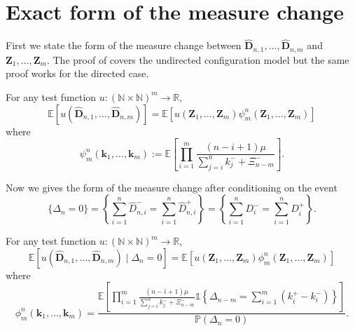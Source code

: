\documentclass[draft]{scrartcl}
\newcommand{\R}{\mathbb R}
\newcommand{\N}{\mathbb N}
\newcommand{\E}{\mathbb E}
\newcommand{\biasD}{\hat{D}}
\newcommand{\unconmc}{\psi}
\newcommand{\conmc}{\phi}
\newcommand{\defeq}{:=}
\newcommand{\indi}{\mathds{1}}
\newcommand{\vect}{\mathbf}
\renewcommand{\Pr}{\mathbb P}
\begin{document}
\section{Exact form of the measure change}

First we state the form of the measure change between $\vect{\biasD}_{n, 1}, \ldots, \vect{\biasD}_{n, m}$ and $\vect{Z}_1, \ldots, \vect{Z}_m$. The proof of \cite[Proposition 4.2]{conchon--kerjan_stable_2020} covers the undirected configuration model but the same proof works for the directed case.

\begin{theorem}
    \label{thm:unconditioned-mc}
    For any test function $u: (\N \times \N)^m \to \R$, 
    \begin{equation}
        \E[u(\vect{\biasD}_{n, 1}, \ldots, \vect{\biasD}_{n, m})] =
        \E[u(\vect{Z}_1, \ldots, \vect{Z}_m) \unconmc^n_m(\vect{Z}_1, \ldots, \vect{Z}_m)]
    \end{equation}
    where
    \begin{equation}
        \unconmc^n_m(\vect{k}_1, \ldots, \vect{k}_m) \defeq
        \E \left[ \prod_{i=1}^m \frac{(n - i + 1)\mu}{\sum_{j=i}^n k_j^- + \Xi^-_{n - m}}\right].
    \end{equation}
\end{theorem}

Now we gives the form of the measure change after conditioning on the event
\begin{equation}
    \{\Delta_n = 0\}
    = \left\{ \sum_{i=1}^n \biasD^-_{n, i} = \sum_{i=1}^n \biasD^+_{n, i} \right\}
    = \left\{ \sum_{i=1}^n D^-_i = \sum_{i=1}^n D^+_i \right\}.
\end{equation}

\begin{theorem}
    For any test function $u: (\N \times \N)^m \to \R$, 
    \begin{equation}
        \E\left[u(\vect{\biasD}_{n, 1}, \ldots, \vect{\biasD}_{n, m}) \mid \Delta_n = 0 \right] =
        \E[u(\vect{Z}_1, \ldots, \vect{Z}_m) \conmc^n_m(\vect{Z}_1, \ldots, \vect{Z}_m)]
        \label{eq:conditioned-measure-change-condition}
    \end{equation}
    where
    \begin{equation}
        \conmc^n_m(\vect{k}_1, \ldots, \vect{k}_m) = \frac{
        \E \left[ \prod_{i=1}^m \frac{(n - i + 1)\mu}{\sum_{j=i}^n k_j^- + \Xi^-_{n - m}}
        \indi \left\{ \Delta_{n-m} = \sum_{i=1}^m (k^+_i - k^-_i) \right\}\right]
        }{\Pr(\Delta_n = 0)}.
    \end{equation}
\end{theorem}
\end{document}
